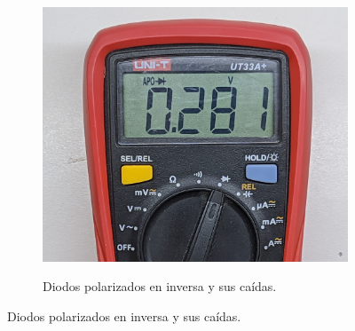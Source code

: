 \documentclass[chaptersright]{informeutn}
\begin{document}
\begin{figure}[!ht]
\begin{subfigure}[b]{1\textwidth}
\begin{minipage}[b]{0.24\textwidth}
          \includegraphics[width=1\textwidth]{pictures/mult_diod-4d.jpg}
        \end{minipage}
      \end{subfigure}
      \begin{subfigure}[b]{1\textwidth}
        \centering
        \caption{Diodos polarizados en inversa y sus caídas.}
        \begin{minipage}[b]{0.24\textwidth}
          \centering

\end{minipage}
\end{subfigure}
\end{figure}
\end{document}

